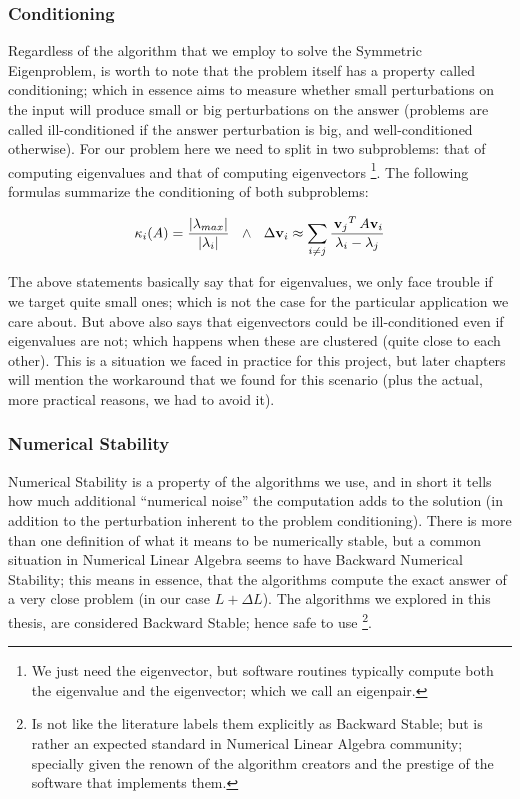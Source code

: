\subsubsection{Conditioning}
Regardless of the algorithm that we employ to solve the Symmetric
Eigenproblem, is worth to note that the problem itself has a property
called conditioning; which in essence aims to measure whether small
perturbations on the input will produce small or big perturbations on the
answer (problems are called ill-conditioned if the answer perturbation
is big, and well-conditioned otherwise). For our problem here we need
to split in two subproblems: 
that of computing eigenvalues and that of computing eigenvectors \footnote{We
just need the eigenvector, but software routines typically compute both the
eigenvalue and the eigenvector; which we call an eigenpair.}. The
following formulas summarize the conditioning of both subproblems:

\begin{equation*}
    \kappa_{i}(A) = \dfrac{\left\lvert \lambda_{max} \right\vert}{\left\lvert \lambda_i \right\vert}
    \,\,\,\,\land\,\,\,\,
    \Delta \mathbf{v}_i \approx \sum\limits_{\tiny{i \ne j}}
    \dfrac{\,{\mathbf{v}_j}^{T}\, A \mathbf{v}_i}{\lambda_i - \lambda_j}  
\end{equation*}
\joinbelow{1cm}

The above statements basically say that for eigenvalues, we only face
trouble if we target quite small ones; which is not the case for the
particular application we care about. But above also says that
eigenvectors could be ill-conditioned even if eigenvalues are not;
which happens when these are clustered (quite close to each
other). This is a situation we faced in practice for this project, but
later chapters will mention the workaround that we found for this
scenario (plus the actual, more practical reasons, we had to avoid
it). 

\subsubsection{Numerical Stability}

Numerical Stability is a property of the algorithms we use, and in
short it tells how much additional ``numerical noise'' the computation
adds to the solution (in addition to the perturbation inherent to the
problem conditioning). There is more than one definition of what it
means to be numerically stable, but a common situation in Numerical
Linear Algebra seems to have Backward Numerical Stability; this means
in essence, that the algorithms compute the exact answer of a very
close problem (in our case $L + \Delta L$). The algorithms we explored 
in this thesis, are considered Backward Stable; hence safe to
use \footnote{Is not like the literature labels them explicitly as Backward
  Stable; but is rather an expected standard in Numerical Linear
  Algebra community; specially given the renown of the algorithm
creators and the prestige of the software that implements them.}. \\

